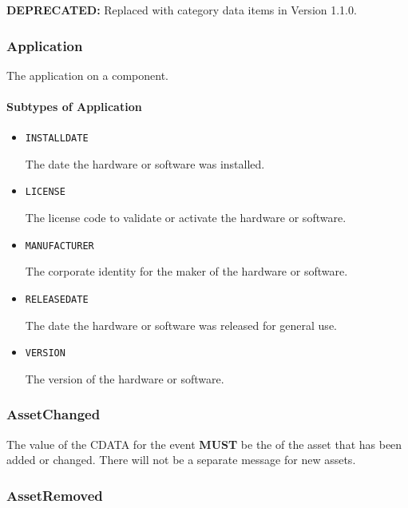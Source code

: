 \textbf{DEPRECATED:} Replaced with  category data items in Version 1.1.0.


\subsubsection{Application}
\label{sec:Application}



The application on a component.



\paragraph{Subtypes of Application}\mbox{}
\label{sec:Subtypes of Application}

\begin{itemize}

\item \texttt{INSTALL\textunderscore DATE}


The date the hardware or software was installed.

\item \texttt{LICENSE}


The license code to validate or activate the hardware or software.

\item \texttt{MANUFACTURER}


The corporate identity for the maker of the hardware or software.


\item \texttt{RELEASE\textunderscore DATE}


The date the hardware or software was released for general use.


\item \texttt{VERSION}


The version of the hardware or software.


\end{itemize}

\subsubsection{AssetChanged}
\label{sec:AssetChanged}



The value of the \gls{CDATA} for the event \textbf{MUST} be the  of the asset that has been added or changed. There will not be a separate message for new assets.


\subsubsection{AssetRemoved}
\label{sec:AssetRemoved}



